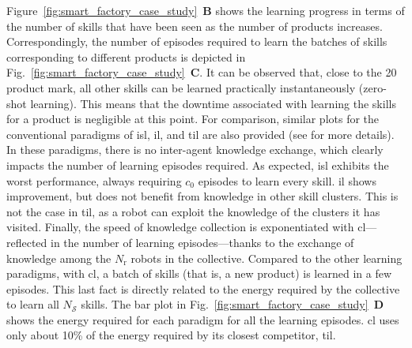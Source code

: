 \documentclass[12pt]{article}
\begin{document}
Figure~\ref{fig:smart_factory_case_study}~\textbf{B} shows the learning progress in terms of the number of skills that have been seen as the number of products increases. Correspondingly, the number of episodes required to learn the batches of skills corresponding to different products is depicted in Fig.~\ref{fig:smart_factory_case_study}~\textbf{C}. It can be observed that, close to the 20 product mark, all other skills can be learned practically instantaneously (zero-shot learning). This means that the downtime associated with learning the skills for a product is negligible at this point. For comparison, similar plots for the conventional paradigms of \ac{isl}, \ac{il}, and \ac{til} are also provided (see  for more details). In these paradigms, there is no inter-agent knowledge exchange, which clearly impacts the number of learning episodes required. As expected, \ac{isl} exhibits the worst performance, always requiring $c_0$ episodes to learn every skill. \ac{il} shows improvement, but does not benefit from knowledge in other skill clusters. This is not the case in \ac{til}, as a robot can exploit the knowledge of the clusters it has visited. Finally, the speed of knowledge collection is exponentiated with \ac{cl}---reflected in the number of learning episodes---thanks to the exchange of knowledge among the $N_\mathrm{r}$ robots in the collective. Compared to the other learning paradigms, with \ac{cl}, a batch of skills (that is, a new product) is learned in a few episodes. This last fact is directly related to the energy required by the collective to learn all $N_\mathcal{S}$ skills. The bar plot in Fig.~\ref{fig:smart_factory_case_study}~\textbf{D} shows the energy required for each paradigm for all the learning episodes. \Acl{cl} uses only about 10\% of the energy required by its closest competitor, \acl{til}.

\end{document}
